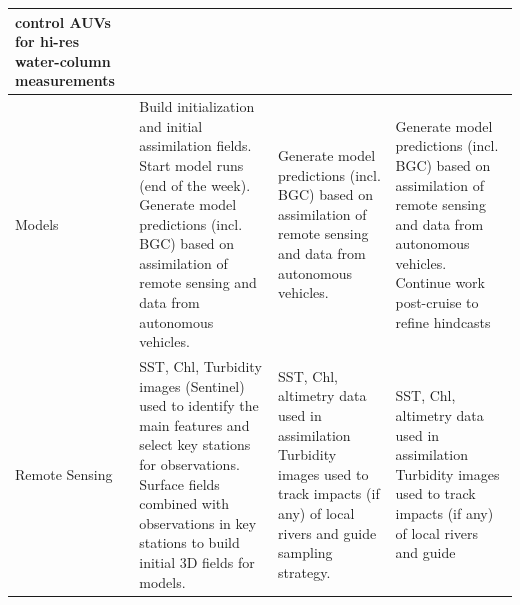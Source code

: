 \begin{longtable}{|p{3cm}|p{4cm}|p{4cm}|p{4cm}|}
                                                                            control
                                                                            AUVs
                                                                            for
                                                                            hi-res
                                                                            water-column measurements\\
    \hline
    Models&Build initialization and initial assimilation fields. 
            Start model runs (end of the week). Generate model
            predictions (incl. BGC) based on assimilation of remote sensing and data
            from autonomous vehicles.&Generate model
                                       predictions (incl. BGC) based on assimilation of remote sensing and data
                                       from autonomous vehicles.&Generate model
                                                                  predictions (incl. BGC) based on assimilation of remote sensing and data
                                                                  from autonomous vehicles. Continue
                                                                  work
                                                                  post-cruise
                                                                  to refine hindcasts\\
    \hline
    Remote Sensing&SST, Chl, Turbidity images (Sentinel) used to
                    identify the main features and select key stations for
                    observations. Surface fields combined with observations in key
                    stations to build initial 3D fields for models.&SST, Chl, altimetry data used in assimilation
                                                                     Turbidity images used to track impacts (if
                                                                     any) of local rivers and guide sampling
                                                                     strategy.
                                                     &SST, Chl,
                                                       altimetry data
                                                       used in
                                                       assimilation 
                                                       Turbidity images used to
                                                       track impacts (if any) of
                                                       local rivers and guide

\end{longtable}
